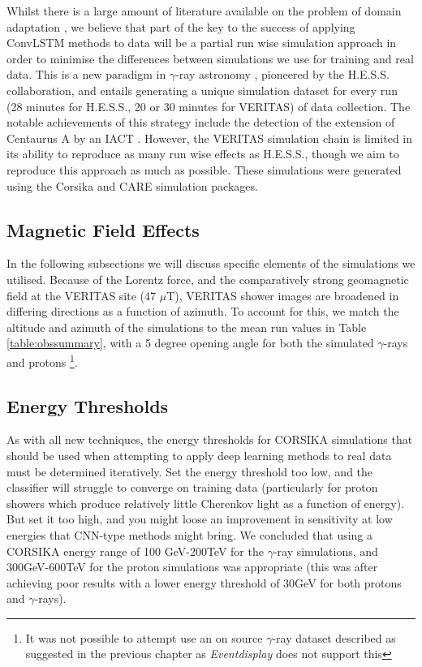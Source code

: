 Whilst there is a large amount of literature available on the problem of domain adaptation \cite{ada}, we believe that part of the key to the success of applying ConvLSTM methods to data will be a partial run wise simulation approach in order to minimise the differences between simulations we use for training and real data. This is a new paradigm in $\gamma$-ray astronomy \cite{rws}, pioneered by the H.E.S.S. collaboration, and entails generating a unique simulation dataset for every run (28 minutes for H.E.S.S., 20 or 30 minutes for VERITAS) of data collection. The notable achievements of this strategy include the detection of the extension of Centaurus A by an IACT \cite{cena}. However, the VERITAS simulation chain is limited in its ability to reproduce as many run wise effects as H.E.S.S., though we aim to reproduce this approach as much as possible. These simulations were generated using the Corsika and CARE \cite{CARE} simulation packages.

\subsection{Magnetic Field Effects}
In the following subsections we will discuss specific elements of the simulations we utilised. Because of the Lorentz force, and the comparatively strong geomagnetic field at the VERITAS site \cite{kraus} (47 $\mu$T), VERITAS shower images are broadened in differing directions as a function of azimuth. To account for this, we match the altitude and azimuth of the simulations to the mean run values in Table \ref{table:obssummary}, with a 5 degree opening angle for both the simulated $\gamma$-rays and protons \footnote{It was not possible to attempt use an on source $\gamma$-ray dataset described as suggested in the previous chapter as \textit{Eventdisplay} does not support this}.

\subsection{Energy Thresholds}
As with all new techniques, the energy thresholds for CORSIKA simulations that should be used when attempting to apply deep learning methods to real data must be determined iteratively. Set the energy threshold too low, and the classifier will struggle to converge on training data (particularly for proton showers which produce relatively little Cherenkov light as a function of energy). But set it too high, and you might loose an improvement in sensitivity at low energies that CNN-type methods might bring. We concluded that using a CORSIKA energy range of 100 GeV-200TeV for the $\gamma$-ray simulations, and 300GeV-600TeV for the proton simulations was appropriate (this was after achieving poor results with a lower energy threshold of 30GeV for both protons and $\gamma$-rays).

